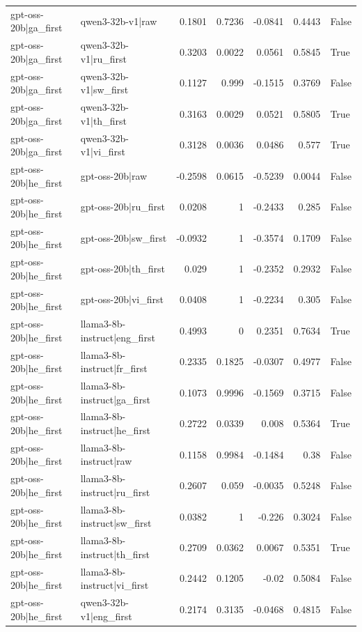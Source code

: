 \begin{table}
\begin{tabular}{l l r r r r l}
gpt-oss-20b|ga_first & qwen3-32b-v1|raw & 0.1801 & 0.7236 & -0.0841 & 0.4443 & False \\
gpt-oss-20b|ga_first & qwen3-32b-v1|ru_first & 0.3203 & 0.0022 & 0.0561 & 0.5845 & True \\
gpt-oss-20b|ga_first & qwen3-32b-v1|sw_first & 0.1127 & 0.999 & -0.1515 & 0.3769 & False \\
gpt-oss-20b|ga_first & qwen3-32b-v1|th_first & 0.3163 & 0.0029 & 0.0521 & 0.5805 & True \\
gpt-oss-20b|ga_first & qwen3-32b-v1|vi_first & 0.3128 & 0.0036 & 0.0486 & 0.577 & True \\
gpt-oss-20b|he_first & gpt-oss-20b|raw & -0.2598 & 0.0615 & -0.5239 & 0.0044 & False \\
gpt-oss-20b|he_first & gpt-oss-20b|ru_first & 0.0208 & 1 & -0.2433 & 0.285 & False \\
gpt-oss-20b|he_first & gpt-oss-20b|sw_first & -0.0932 & 1 & -0.3574 & 0.1709 & False \\
gpt-oss-20b|he_first & gpt-oss-20b|th_first & 0.029 & 1 & -0.2352 & 0.2932 & False \\
gpt-oss-20b|he_first & gpt-oss-20b|vi_first & 0.0408 & 1 & -0.2234 & 0.305 & False \\
gpt-oss-20b|he_first & llama3-8b-instruct|eng_first & 0.4993 & 0 & 0.2351 & 0.7634 & True \\
gpt-oss-20b|he_first & llama3-8b-instruct|fr_first & 0.2335 & 0.1825 & -0.0307 & 0.4977 & False \\
gpt-oss-20b|he_first & llama3-8b-instruct|ga_first & 0.1073 & 0.9996 & -0.1569 & 0.3715 & False \\
gpt-oss-20b|he_first & llama3-8b-instruct|he_first & 0.2722 & 0.0339 & 0.008 & 0.5364 & True \\
gpt-oss-20b|he_first & llama3-8b-instruct|raw & 0.1158 & 0.9984 & -0.1484 & 0.38 & False \\
gpt-oss-20b|he_first & llama3-8b-instruct|ru_first & 0.2607 & 0.059 & -0.0035 & 0.5248 & False \\
gpt-oss-20b|he_first & llama3-8b-instruct|sw_first & 0.0382 & 1 & -0.226 & 0.3024 & False \\
gpt-oss-20b|he_first & llama3-8b-instruct|th_first & 0.2709 & 0.0362 & 0.0067 & 0.5351 & True \\
gpt-oss-20b|he_first & llama3-8b-instruct|vi_first & 0.2442 & 0.1205 & -0.02 & 0.5084 & False \\
gpt-oss-20b|he_first & qwen3-32b-v1|eng_first & 0.2174 & 0.3135 & -0.0468 & 0.4815 & False \\

\end{tabular}
\end{table}

